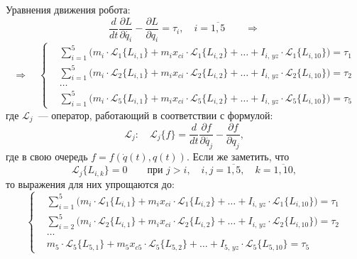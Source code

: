 Уравнения движения робота:
\begin{equation}
\frac{d}{dt}\frac{\partial L}{\partial\dot{q_i}} - \frac{\partial L}{\partial q_i} = \tau_i, \quad i = \overline{1,5} \qquad \Rightarrow
\end{equation}
\begin{equation}
\Rightarrow \quad
\left\{
\begin{aligned}
\!&\sum_{i=1}^5 \bigl( m_i \cdot \mathcal{L}_1 \{L_{i,1}\} + m_i x_{ci} \cdot \mathcal{L}_1 \{L_{i,2}\} + \ldots + I_{i,\,yz} \cdot \mathcal{L}_1 \{L_{i,10}\} \bigr) = \tau_1\\
\!&\sum_{i=1}^5 \bigl( m_i \cdot \mathcal{L}_2 \{L_{i,1}\} + m_i x_{ci} \cdot \mathcal{L}_2 \{L_{i,2}\} + \ldots + I_{i,\,yz} \cdot \mathcal{L}_2 \{L_{i,10}\} \bigr) = \tau_2\\
\!&\ldots\\
\!&\sum_{i=1}^5 \bigl( m_i \cdot \mathcal{L}_5 \{L_{i,1}\} + m_i x_{ci} \cdot \mathcal{L}_5 \{L_{i,2}\} + \ldots + I_{i,\,yz} \cdot \mathcal{L}_5 \{L_{i,10}\} \bigr) = \tau_5
\end{aligned}
\right.
\end{equation}
где $\mathcal{L}_j$~--- оператор, работающий в соответствии с формулой:
\begin{equation}
\mathcal{L}_j : \quad \mathcal{L}_j \{f\} = \frac{d}{dt}\frac{\partial f}{\partial\dot{q_j}} - \frac{\partial f}{\partial q_j},
\end{equation}
где в свою очередь $f = f(\dot{q}(t), q(t))$.
Если же заметить, что
\begin{equation}
\mathcal{L}_j \{L_{i,k}\} = 0 \qquad \text{при }j > i, \quad i,j=\overline{1,5}, \quad k=\overline{1,10},
\end{equation}
то выражения для них упрощаются до:
\begin{equation}
\left\{
\begin{aligned}
\!&\sum_{i=1}^5 \bigl( m_i \cdot \mathcal{L}_1 \{L_{i,1}\} + m_i x_{ci} \cdot \mathcal{L}_1 \{L_{i,2}\} + \ldots + I_{i,\,yz} \cdot \mathcal{L}_1 \{L_{i,10}\} \bigr) = \tau_1\\
\!&\sum_{i=2}^5 \bigl( m_i \cdot \mathcal{L}_2 \{L_{i,1}\} + m_i x_{ci} \cdot \mathcal{L}_2 \{L_{i,2}\} + \ldots + I_{i,\,yz} \cdot \mathcal{L}_2 \{L_{i,10}\} \bigr) = \tau_2\\
\!&\ldots\\
\!& m_5 \cdot \mathcal{L}_5 \{L_{5,1}\} + m_5 x_{c5} \cdot \mathcal{L}_5 \{L_{5,2}\} + \ldots + I_{5,\,yz} \cdot \mathcal{L}_5 \{L_{5,10}\} = \tau_5
\end{aligned}
\right.
\end{equation}
